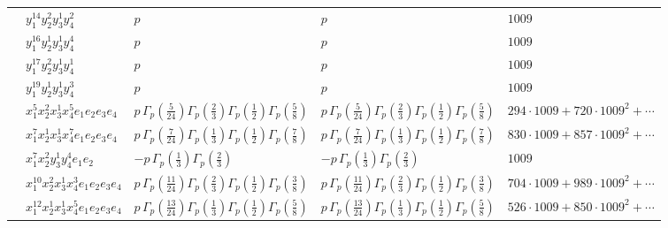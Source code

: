 \documentclass[11pt]{article}
\begin{document}
\begin{table}[ht]
{\begin{tabular}{@{}lllll@{}}
 & $y_{1}^{14} y_{2}^{2} y_{3}^{1} y_{4}^{2}$ & $p \,$ & $p \,$ & $1009$ \\
 & $y_{1}^{16} y_{2}^{1} y_{3}^{1} y_{4}^{4}$ & $p \,$ & $p \,$ & $1009$ \\
 & $y_{1}^{17} y_{2}^{2} y_{3}^{1} y_{4}^{1}$ & $p \,$ & $p \,$ & $1009$ \\
 & $y_{1}^{19} y_{2}^{1} y_{3}^{1} y_{4}^{3}$ & $p \,$ & $p \,$ & $1009$ \\
 & $x_{1}^{5} x_{2}^{2} x_{3}^{1} x_{4}^{5}  e_{1} e_{2} e_{3} e_{4}$ & $p \, \Gamma_p \left( \frac{5}{24} \right) \Gamma_p \left( \frac{2}{3} \right) \Gamma_p \left( \frac{1}{2} \right) \Gamma_p \left( \frac{5}{8} \right)$ & $p \, \Gamma_p \left( \frac{5}{24} \right) \Gamma_p \left( \frac{2}{3} \right) \Gamma_p \left( \frac{1}{2} \right) \Gamma_p \left( \frac{5}{8} \right)$ & $294{\cdot}1009{+}720{\cdot}1009^{2}{+}\cdots$ \\
 & $x_{1}^{7} x_{2}^{1} x_{3}^{1} x_{4}^{7}  e_{1} e_{2} e_{3} e_{4}$ & $p \, \Gamma_p \left( \frac{7}{24} \right) \Gamma_p \left( \frac{1}{3} \right) \Gamma_p \left( \frac{1}{2} \right) \Gamma_p \left( \frac{7}{8} \right)$ & $p \, \Gamma_p \left( \frac{7}{24} \right) \Gamma_p \left( \frac{1}{3} \right) \Gamma_p \left( \frac{1}{2} \right) \Gamma_p \left( \frac{7}{8} \right)$ & $830{\cdot}1009{+}857{\cdot}1009^{2}{+}\cdots$ \\
 & $x_{1}^{7} x_{2}^{2} y_{3}^{1} y_{4}^{4} e_{1} e_{2}$ & $- p \, \Gamma_p \left( \frac{1}{3} \right) \Gamma_p \left( \frac{2}{3} \right)$ & $- p \, \Gamma_p \left( \frac{1}{3} \right) \Gamma_p \left( \frac{2}{3} \right)$ & $1009$ \\
 & $x_{1}^{10} x_{2}^{2} x_{3}^{1} x_{4}^{3}  e_{1} e_{2} e_{3} e_{4}$ & $p \, \Gamma_p \left( \frac{11}{24} \right) \Gamma_p \left( \frac{2}{3} \right) \Gamma_p \left( \frac{1}{2} \right) \Gamma_p \left( \frac{3}{8} \right)$ & $p \, \Gamma_p \left( \frac{11}{24} \right) \Gamma_p \left( \frac{2}{3} \right) \Gamma_p \left( \frac{1}{2} \right) \Gamma_p \left( \frac{3}{8} \right)$ & $704{\cdot}1009{+}989{\cdot}1009^{2}{+}\cdots$ \\
 & $x_{1}^{12} x_{2}^{1} x_{3}^{1} x_{4}^{5}  e_{1} e_{2} e_{3} e_{4}$ & $p \, \Gamma_p \left( \frac{13}{24} \right) \Gamma_p \left( \frac{1}{3} \right) \Gamma_p \left( \frac{1}{2} \right) \Gamma_p \left( \frac{5}{8} \right)$ & $p \, \Gamma_p \left( \frac{13}{24} \right) \Gamma_p \left( \frac{1}{3} \right) \Gamma_p \left( \frac{1}{2} \right) \Gamma_p \left( \frac{5}{8} \right)$ & $526{\cdot}1009{+}850{\cdot}1009^{2}{+}\cdots$ \\

\end{tabular}}
\end{table}
\end{document}

